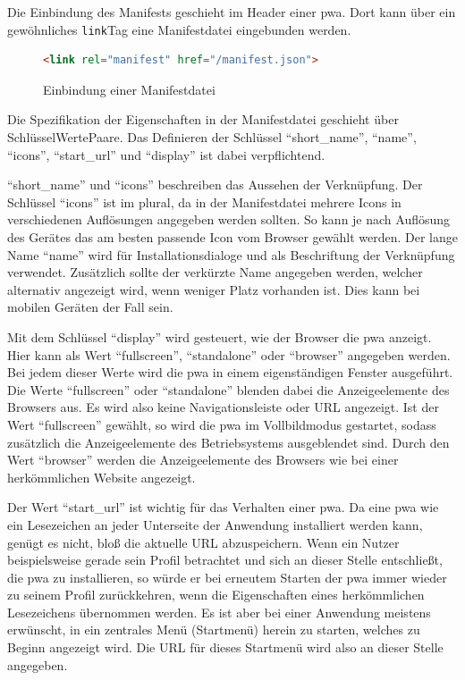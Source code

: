 \documentclass[12pt, parskip=half]{scrartcl}       %
\begin{document}
Die Einbindung des Manifests geschieht im Header einer \ac{pwa}.
Dort kann über ein gewöhnliches \texttt{link}\-Tag eine Manifestdatei eingebunden werden.

\begin{figure}[h]
\begin{lstlisting}[language=HTML]
                <link rel="manifest" href="/manifest.json">
\end{lstlisting}
\caption{Einbindung einer Manifestdatei}
\label{fig:html_linkmanifest}
\end{figure}

Die Spezifikation der Eigenschaften in der Manifestdatei geschieht über Schlüssel\-Werte\-Paare.
Das Definieren der Schlüssel \enquote{short\_name}, \enquote{name}, \enquote{icons}, \enquote{start\_url} und \enquote{display} ist dabei verpflichtend.

\enquote{short\_name} und \enquote{icons} beschreiben das Aussehen der Verknüpfung.
Der Schlüssel \enquote{icons} ist im plural, da in der Manifestdatei mehrere Icons in verschiedenen Auflösungen angegeben werden sollten.
So kann je nach Auflösung des Gerätes das am besten passende Icon vom Browser gewählt werden.
Der lange Name \enquote{name} wird für Installationsdialoge und als Beschriftung der Verknüpfung verwendet.
Zusätzlich sollte der verkürzte Name angegeben werden, welcher alternativ angezeigt wird, wenn weniger Platz vorhanden ist.\cite{chromedevs_manifestname}
Dies kann bei mobilen Geräten der Fall sein.

Mit dem Schlüssel \enquote{display} wird gesteuert, wie der Browser die \ac{pwa} anzeigt.
Hier kann als Wert \enquote{fullscreen}, \enquote{standalone} oder \enquote{browser} angegeben werden.
Bei jedem dieser Werte wird die \ac{pwa} in einem eigenständigen Fenster ausgeführt.
Die Werte \enquote{fullscreen} oder \enquote{standalone} blenden dabei die Anzeigeelemente des Browsers aus.
Es wird also keine Navigationsleiste oder URL angezeigt.
Ist der Wert \enquote{fullscreen} gewählt, so wird die \ac{pwa} im Vollbildmodus gestartet, sodass zusätzlich die Anzeigeelemente des Betriebsystems ausgeblendet sind.
Durch den Wert \enquote{browser} werden die Anzeigeelemente des Browsers wie bei einer herkömmlichen Website angezeigt.\cite{googledev_manifest}

Der Wert \enquote{start\_url} ist wichtig für das Verhalten einer \ac{pwa}.
Da eine \ac{pwa} wie ein Lesezeichen an jeder Unterseite der Anwendung installiert werden kann, genügt es nicht, bloß die aktuelle URL abzuspeichern.
Wenn ein Nutzer beispielsweise gerade sein Profil betrachtet und sich an dieser Stelle entschließt, die \ac{pwa} zu installieren, so würde er bei erneutem Starten der \ac{pwa} immer wieder zu seinem Profil zurückkehren, wenn die Eigenschaften eines herkömmlichen Lesezeichens übernommen werden.
Es ist aber bei einer Anwendung meistens erwünscht, in ein zentrales Menü (Startmenü) herein zu starten, welches zu Beginn angezeigt wird.
Die URL für dieses Startmenü wird also an dieser Stelle angegeben.
\end{document}
